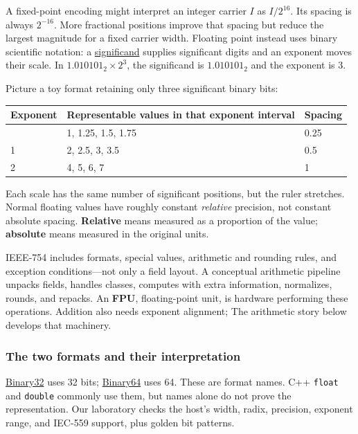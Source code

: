A fixed-point encoding might interpret an integer carrier \(I\) as \(I/2^{16}\). Its spacing is always \(2^{-16}\). More fractional positions improve that spacing but reduce the largest magnitude for a fixed carrier width. Floating point instead uses binary scientific notation: a \hyperref[appendix-a24fd710cf67]{significand} supplies significant digits and an exponent moves their scale. In \(1.010101_2\times2^3\), the significand is \(1.010101_2\) and the exponent is 3.

Picture a toy format retaining only three significant binary bits:

{\def\LTcaptype{none} %
\begin{longtable}[]{@{}lll@{}}
\toprule\noalign{}
Exponent & Representable values in that exponent interval & Spacing \\
\midrule\noalign{}
\endhead
\bottomrule\noalign{}
\endlastfoot
0 & 1, 1.25, 1.5, 1.75 & 0.25 \\
1 & 2, 2.5, 3, 3.5 & 0.5 \\
2 & 4, 5, 6, 7 & 1 \\
\end{longtable}
}

Each scale has the same number of significant positions, but the ruler stretches. Normal floating values have roughly constant \emph{relative} precision, not constant absolute spacing. \textbf{Relative} means measured as a proportion of the value; \textbf{absolute} means measured in the original units.

IEEE-754 includes formats, special values, arithmetic and rounding rules, and exception conditions---not only a field layout. A conceptual arithmetic pipeline unpacks fields, handles classes, computes with extra information, normalizes, rounds, and repacks. An \textbf{FPU}, floating-point unit, is hardware performing these operations. Addition also needs exponent alignment; The arithmetic story below develops that machinery.

\subsubsection{The two formats and their interpretation}\label{01-foundations-i-ch001-the-two-formats-and-their-interpretation}

\hypertarget{01-foundations-i-ch001-the-two-formats-and-their-interpretation}{}

\hyperref[appendix-5057f9ad327f]{Binary32} uses 32 bits; \hyperref[appendix-5078dfab64e6]{Binary64} uses 64. These are format names. C++ \texttt{float} and \texttt{double} commonly use them, but names alone do not prove the representation. Our laboratory checks the host's width, radix, precision, exponent range, and IEC-559 support, plus golden bit patterns.

